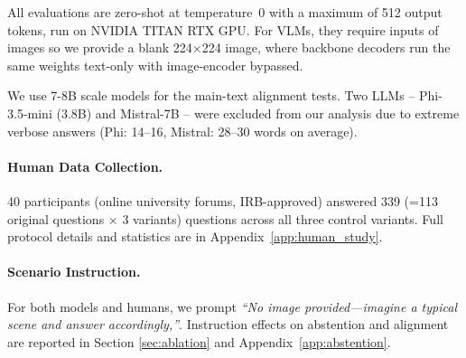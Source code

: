 \documentclass[letterpaper]{article}
\begin{document}
All evaluations are zero-shot at temperature~0 with a maximum of 512 output tokens, run on NVIDIA TITAN RTX GPU. 
For VLMs, they require inputs of images so we provide a blank 224$\times$224 image, where backbone decoders run the same weights text-only with image-encoder bypassed.  %

We use 7-8B scale models for the main-text alignment tests. Two LLMs -- Phi-3.5-mini (3.8B) and Mistral-7B -- were excluded from our analysis due to extreme verbose answers (Phi: 14--16, Mistral: 28--30 words on average). %


\paragraph{Human Data Collection.}\label{sec:human_data}

40 participants (online university forums, IRB-approved) answered 339 (=113 original questions $\times$ 3 variants) questions across all three control variants. %
Full protocol details and statistics are in Appendix~\ref{app:human_study}. %

\paragraph{Scenario Instruction.}
For both models and humans, we prompt \textit{``No image provided---imagine a typical scene and answer accordingly,''}. 
Instruction effects on abstention and alignment are reported in Section \ref{sec:ablation} and Appendix~\ref{app:abstention}. %
\end{document}
